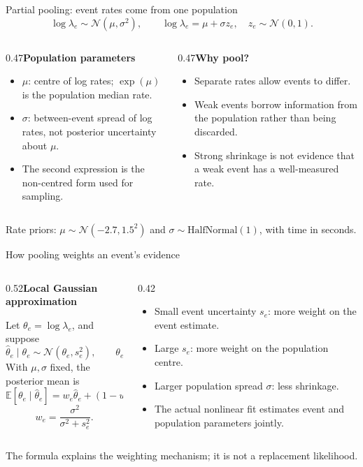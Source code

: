 \documentclass[aspectratio=169,11pt]{beamer}
\newcommand{\source}[1]{\par\vfill{\scriptsize\color{muted}#1}\par}
\newcommand{\heading}[1]{{\bfseries #1}\par\vspace{0.4em}}
\begin{document}
\begin{frame}{Partial pooling: event rates come from one population}
\[\log\lambda_e\sim\mathcal N(\mu,\sigma^2),\qquad
\log\lambda_e=\mu+\sigma z_e,\quad z_e\sim\mathcal N(0,1).\]
\begin{columns}[T,onlytextwidth]
\begin{column}{0.47\textwidth}\heading{Population parameters}
\begin{itemize}
\item $\mu$: centre of log rates; $\exp(\mu)$ is the population median rate.
\item $\sigma$: between-event spread of log rates, not posterior uncertainty about $\mu$.
\item The second expression is the non-centred form used for sampling.
\end{itemize}\end{column}
\begin{column}{0.47\textwidth}\heading{Why pool?}
\begin{itemize}
\item Separate rates allow events to differ.
\item Weak events borrow information from the population rather than being discarded.
\item Strong shrinkage is not evidence that a weak event has a well-measured rate.
\end{itemize}\end{column}\end{columns}
\source{Rate priors: $\mu\sim\mathcal N(-2.7,1.5^2)$ and $\sigma\sim\mathrm{HalfNormal}(1)$, with time in seconds.}
\end{frame}

\begin{frame}{How pooling weights an event's evidence}
\begin{columns}[T,onlytextwidth]
\begin{column}{0.52\textwidth}\heading{Local Gaussian approximation}
Let $\theta_e=\log\lambda_e$, and suppose
\[\widehat\theta_e\mid\theta_e\sim\mathcal N(\theta_e,s_e^2),\qquad
\theta_e\sim\mathcal N(\mu,\sigma^2).\]
With $\mu,\sigma$ fixed, the posterior mean is
\[\mathbb E[\theta_e\mid\widehat\theta_e]
=w_e\widehat\theta_e+(1-w_e)\mu,\]
\[w_e=\frac{\sigma^2}{\sigma^2+s_e^2}.\]
\end{column}
\begin{column}{0.42\textwidth}\begin{itemize}
\item Small event uncertainty $s_e$: more weight on the event estimate.
\item Large $s_e$: more weight on the population centre.
\item Larger population spread $\sigma$: less shrinkage.
\item The actual nonlinear fit estimates event and population parameters jointly.
\end{itemize}\end{column}\end{columns}
\source{The formula explains the weighting mechanism; it is not a replacement likelihood.}
\end{frame}
\end{document}
